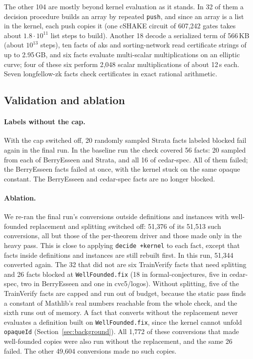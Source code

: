\documentclass[11pt]{article}
\begin{document}
The other 104 are mostly beyond kernel evaluation as it stands. In 32 of them a decision procedure builds an
array by repeated \texttt{push}, and since an array is a list in the kernel, each push copies it (one cSHAKE
circuit of 607,242 gates takes about \(1.8\cdot 10^{11}\) list steps to build). Another 18 decode a
serialized term of 566\,KB (about \(10^{13}\) steps), ten facts of aks and sorting-network read certificate
strings of up to 2.95\,GB, and six facts evaluate multi-scalar multiplications on an elliptic curve; four of
these six perform 2,048 scalar multiplications of about 12\,s each. Seven longfellow-zk facts check
certificates in exact rational arithmetic.

\subsection{Validation and ablation}\label{sec:valid}
\paragraph{Labels without the cap.} With the cap switched off, 20 randomly sampled Strata facts labeled
blocked fail again in the final run. In the baseline run the check covered 56 facts: 20 sampled from each of
BerryEsseen and Strata, and all 16 of cedar-spec. All of them failed; the BerryEsseen facts failed at once,
with the kernel stuck on the same opaque constant. The BerryEsseen and cedar-spec facts are no longer blocked.

\paragraph{Ablation.} We re-ran the final run's conversions outside definitions and instances with
well-founded replacement and splitting switched off: 51,376 of its 51,513 such conversions, all but those of
the per-theorem driver and those made only in the heavy pass. This is close to applying \texttt{decide +kernel} to each fact, except that facts inside definitions and
instances are still rebuilt first. In this run, 51,344 converted again. The 32 that did not are six
TrainVerify facts that need splitting and 26 facts blocked at \texttt{WellFounded.fix} (18 in
formal-conjectures, five in cedar-spec, two in BerryEsseen and one in cvc5/logos). Without splitting, five of
the TrainVerify facts are capped and run out of budget, because the static pass finds a constant of Mathlib's
real numbers reachable from the whole check, and the sixth runs out of memory. A fact that converts without
the replacement never evaluates a definition built on \texttt{WellFounded.fix}, since the kernel cannot
unfold \texttt{opaqueId} (Section~\ref{sec:background}). All 1,772 of these conversions that made well-founded copies were also run without
the replacement, and the same 26 failed. The other 49,604 conversions made no such copies.
\end{document}
